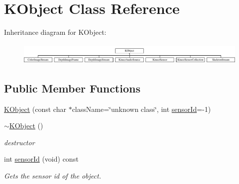 \hypertarget{class_k_object}{\section{\-K\-Object \-Class \-Reference}
\label{class_k_object}
}
\-Inheritance diagram for \-K\-Object\-:\begin{figure}[H]
\begin{center}
\leavevmode
\includegraphics[height=1.059603cm]{class_k_object}
\end{center}
\end{figure}
\subsection*{\-Public \-Member \-Functions}
\begin{DoxyCompactItemize}
\item 
\hyperlink{class_k_object_a6683116c693e9a37c0ef00652353cdee}{\-K\-Object} (const char $\ast$class\-Name=\char`\"{}unknown class\char`\"{}, int \hyperlink{class_k_object_a72b28971b996b8a2b70d567c295e5b34}{sensor\-Id}=-\/1)
\item 
\hypertarget{class_k_object_a44b9ce312ca5ba79132f5b75f2ff0744}{\hyperlink{class_k_object_a44b9ce312ca5ba79132f5b75f2ff0744}{$\sim$\-K\-Object} ()}\label{class_k_object_a44b9ce312ca5ba79132f5b75f2ff0744}

\begin{DoxyCompactList}\small\item\em destructor \end{DoxyCompactList}\item 
int \hyperlink{class_k_object_a72b28971b996b8a2b70d567c295e5b34}{sensor\-Id} (void) const 
\begin{DoxyCompactList}\small\item\em \-Gets the sensor id of the object. \end{DoxyCompactList}\end{DoxyCompactItemize}
